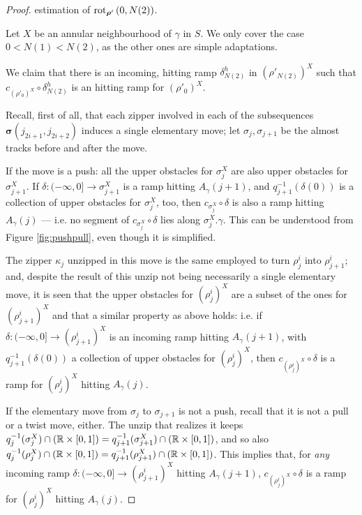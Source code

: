 \begin{proof}

 estimation of $\mathrm{rot}_{\bm\rho'}\left(0,N(2)\right)$.

Let $X$ be an annular neighbourhood of $\gamma$ in $S$. We only cover the case $0<N(1)<N(2)$, as the other ones are simple adaptations. 

We claim that there is an incoming, hitting ramp $\delta^h_{N(2)}$ in $(\rho'_{N(2)})^X$ such that $c_{(\rho'_0)^X}\circ \delta^h_{N(2)}$ is an hitting ramp for $(\rho'_0)^X$.

Recall, first of all, that each zipper involved in each of the subsequences\linebreak $\bm\sigma(j_{2i+1},j_{2i+2})$ induces a single elementary move; let $\sigma_j,\sigma_{j+1}$ be the almost tracks before and after the move.

If the move is a push: all the upper obstacles for $\sigma_j^X$ are also upper obstacles for $\sigma_{j+1}^X$. If $\delta:(-\infty,0]\rightarrow \sigma_{j+1}^X$ is a ramp hitting $A_\gamma(j+1)$, and $q_{j+1}^{-1}\left(\delta(0)\right)$ is a collection of upper obstacles for $\sigma_j^X$, too, then $c_{\sigma_j^X}\circ \delta$ is also a ramp hitting $A_\gamma(j)$ --- i.e. no segment of $c_{\sigma_j^X}\circ \delta$ lies along $\sigma_j^X.\gamma$. This can be understood from Figure \ref{fig:pushpull}, even though it is simplified.

The zipper $\kappa_j$ unzipped in this move is the same employed to turn $\rho^i_j$ into $\rho^i_{j+1}$; and, despite the result of this unzip not being necessarily a single elementary move, it is seen that the upper obstacles for $(\rho^i_j)^X$ are a subset of the ones for $(\rho^i_{j+1})^X$ and that a similar property as above holds: i.e. if $\delta:(-\infty,0]\rightarrow (\rho^i_{j+1})^X$ is an incoming ramp hitting $A_\gamma(j+1)$, with $q_{j+1}^{-1}\left(\delta(0)\right)$ a collection of upper obstacles for $(\rho^i_j)^X$, then $c_{(\rho^i_j)^X}\circ\delta$ is a ramp for $(\rho^i_j)^X$ hitting $A_\gamma(j)$.

If the elementary move from $\sigma_j$ to $\sigma_{j+1}$ is not a push, recall that it is not a pull or a twist move, either. The unzip that realizes it keeps $q_j^{-1}(\sigma_j^X)\cap\left(\mathbb R\times[0,1]\right)= q_{j+1}^{-1}(\sigma_{j+1}^X)\cap\left(\mathbb R\times[0,1]\right)$, and so also $q_j^{-1}(\rho_j^X)\cap\left(\mathbb R\times[0,1]\right)= q_{j+1}^{-1}(\rho_{j+1}^X)\cap\left(\mathbb R\times[0,1]\right)$. This implies that, for \emph{any} incoming ramp $\delta:(-\infty,0]\rightarrow (\rho^i_{j+1})^X$ hitting $A_\gamma(j+1)$, $c_{(\rho^i_j)^X}\circ\delta$ is a ramp for $(\rho^i_j)^X$ hitting $A_\gamma(j)$.


\end{proof}
